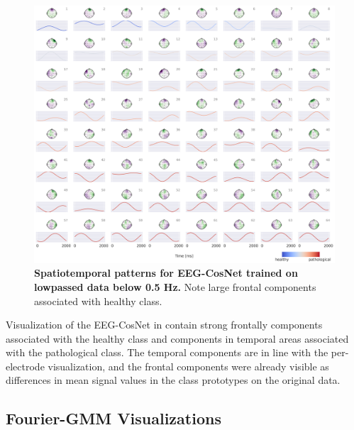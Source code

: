 \begin{figure}[h!tb]
    \myfloatalign
    \includegraphics[width=1\linewidth]{images/cos-sim-net-low-freq-pattern-with-hspace.png}
    \caption[EEG-CosNet visualizations on lowpassed data]{
\textbf{Spatiotemporal patterns for EEG-CosNet trained on lowpassed data
below 0.5 Hz.} Note large frontal components associated with healthy
class.
}
\label{cos-sim-net-low-freq-pattern-fig}
\end{figure}


Visualization of the EEG-CosNet in
 contain strong
frontally components associated with the healthy class and components in
temporal areas associated with the pathological class. The temporal
components are in line with the per-electrode visualization, and the
frontal components were already visible as differences in mean signal
values in the class prototypes on the original data.


\subsection{Fourier-GMM
Visualizations}\label{fourier-gmm-visualizations}



